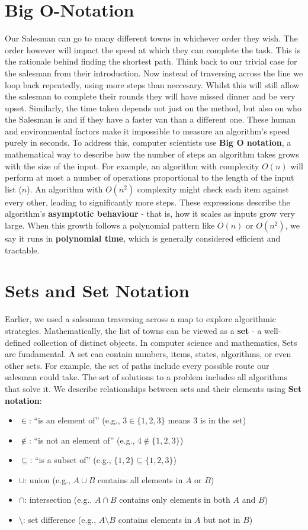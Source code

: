 \documentclass[12pt]{report}
\begin{document}
\section{Big O-Notation}
Our Salesman can go to many different towns in whichever order they wish.
The order however will impact the speed at which they can complete the task.
This is the rationale behind finding the shortest path.
Think back to our trivial case for the salesman from their introduction.
Now instead of traversing across the line we loop back repeatedly, using more steps than neccesary.
Whilst this will still allow the salesman to complete their rounds they will have missed dinner and be very upset.
Similarly, the time taken depends not just on the method, but also on who the Salesman is and if they have a faster van than a different one.
These human and environmental factors make it impossible to measure an algorithm's speed purely in seconds.
To address this, computer scientists use \textbf{Big O notation}, a mathematical way to describe how the number of steps an algorithm takes grows with the size of the input.
For example, an algorithm with complexity $O(n)$ will perform at most a number of operations proportional to the length of the input list ($n$).
An algorithm with $O(n^2)$ complexity might check each item against every other, leading to significantly more steps.
These expressions describe the algorithm’s \textbf{asymptotic behaviour} - that is, how it scales as inputs grow very large.
When this growth follows a polynomial pattern like $O(n)$ or $O(n^2)$, we say it runs in \textbf{polynomial time}, which is generally considered efficient and tractable.

\section{Sets and Set Notation}
Earlier, we used a salesman traversing across a map to explore algorithmic strategies.
Mathematically, the list of towns can be viewed as a \textbf{set} - a well-defined collection of distinct objects.
In computer science and mathematics, Sets are fundamental.
A set can contain numbers, items, states, algorithms, or even other sets.
For example, the set of paths include every possible route our salesman could take.
The set of solutions to a problem includes all algorithms that solve it.
We describe relationships between sets and their elements using \textbf{Set notation}:
\begin{itemize}
    \item $\in$: “is an element of” (e.g., $3 \in \{1, 2, 3\}$ means 3 is in the set)
    \item $\notin$: “is not an element of” (e.g., $4 \notin \{1, 2, 3\}$)
    \item $\subseteq$: “is a subset of” (e.g., $\{1,2\} \subseteq \{1,2,3\}$)
    \item $\cup$: union (e.g., $A \cup B$ contains all elements in $A$ or $B$)
    \item $\cap$: intersection (e.g., $A \cap B$ contains only elements in both $A$ and $B$)
    \item $\setminus$: set difference (e.g., $A \setminus B$ contains elements in $A$ but not in $B$)
\end{itemize}
\end{document}
